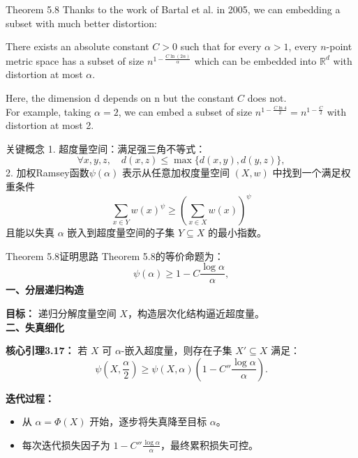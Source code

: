 \documentclass[xcolor=dvipsnames]{beamer}
\theoremstyle{remark}
\begin{document}
\begin{frame}{Theorem 5.8}
  \hspace*{1em}Thanks to the work of Bartal et al. in 2005, we can embedding a subset with much better distortion:\\
    \begin{theorem}
      There exists an absolute constant $C > 0$ such that for every $\alpha > 1$, every $n$-point metric space has a subset of size $n^{1 - \frac{C \ln(2\alpha)}{\alpha}}$ which can be embedded into $\mathbb{R}^d$ with distortion at most $\alpha$.
    \end{theorem}
    \hspace*{1em}Here, the dimension d depends on n but the constant $C$ does not.\\
    \hspace*{1em}For example, taking $\alpha = 2$, we can embed a subset of size $n^{1 - \frac{C \ln 4}{2}} = n^{1 - \frac{C}{2}}$ with distortion at most 2.\\
\end{frame}
\begin{frame}{关键概念}
 1. 超度量空间：满足强三角不等式：
 \[
 \forall x, y, z,\quad d(x, z) \leq \max\{d(x, y), d(y, z)\},
 \]
 2. 加权Ramsey函数\(\psi(\alpha)\) 表示从任意加权度量空间 \((X, w)\) 中找到一个满足权重条件
\[
\sum_{x \in Y} w(x)^{\psi} \geq \left( \sum_{x \in X} w(x) \right)^{\psi}
\]
且能以失真 \(\alpha\) 嵌入到超度量空间的子集 \(Y \subseteq X\) 的最小指数。\\

\end{frame}
\begin{frame}{Theorem 5.8证明思路}
  Theorem 5.8的等价命题为：
\[
\psi(\alpha) \geq 1 - C \frac{\log \alpha}{\alpha},
\]
  \textbf{一、分层递归构造}  
  \vspace{0.1cm}
  
  \textbf{目标：} 递归分解度量空间 \( X \)，构造层次化结构逼近超度量。\\
  \textbf{\large 二、失真细化}  
  \vspace{0.1cm}
  
  \textbf{核心引理3.17：} 若 \( X \) 可 \( \alpha \)-嵌入超度量，则存在子集 \( X' \subseteq X \) 满足：
  \[
  \psi\left(X, \frac{\alpha}{2}\right) \geq \psi(X, \alpha) \left(1 - C'' \frac{\log \alpha}{\alpha}\right).
  \]
  
  \textbf{迭代过程：}
  \begin{itemize}
      \item 从 \( \alpha = \Phi(X) \) 开始，逐步将失真降至目标 \( \alpha \)。
      \item 每次迭代损失因子为 \( 1 - C'' \frac{\log \alpha}{\alpha} \)，最终累积损失可控。
  \end{itemize}
   \end{frame}
    
\end{document}
